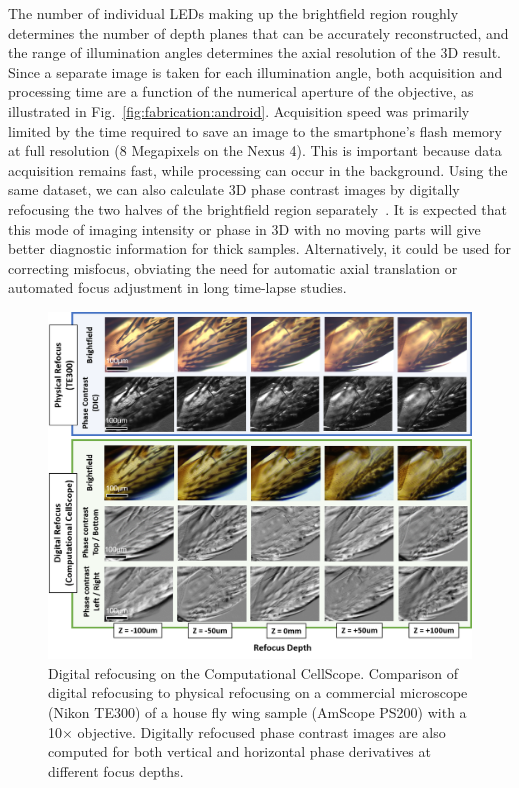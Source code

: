 The number of individual LEDs making up the brightfield region roughly determines the number of depth planes that can be accurately reconstructed, and the range of illumination angles determines the axial resolution of the 3D result. Since a separate image is taken for each illumination angle, both acquisition and processing time are a function of the numerical aperture of the objective, as illustrated in Fig.~\ref{fig:fabrication:android}. Acquisition speed was primarily limited by the time required to save an image to the smartphone's flash memory at full resolution (8 Megapixels on the Nexus 4). This is important because data acquisition remains fast, while processing can occur in the background. Using the same dataset, we can also calculate 3D phase contrast images by digitally refocusing the two halves of the brightfield region separately~\cite{Tian14}. It is expected that this mode of imaging intensity or phase in 3D with no moving parts will give better diagnostic information for thick samples. Alternatively, it could be used for correcting misfocus, obviating the need for automatic axial translation or automated focus adjustment in long time-lapse studies.

\begin{figure}
\begin{center}
\includegraphics[width=\textwidth]{figures/fig_ccs_refocus.png}
\end{center}

\caption { {Digital refocusing on the Computational CellScope.} Comparison of digital refocusing to physical refocusing on a commercial microscope (Nikon TE300) of a house fly wing sample (AmScope PS200) with a 10$\times$ objective. Digitally refocused phase contrast images are also computed for both vertical and horizontal phase derivatives at different focus depths.}

\label{fig:fabrication:digrefocus}
\end{figure}

